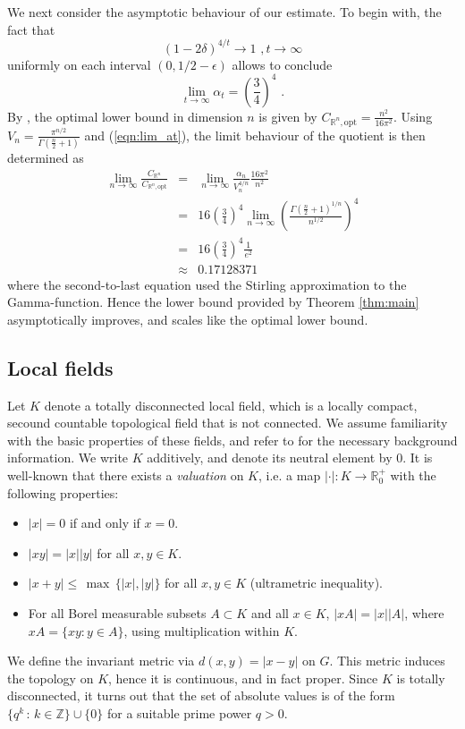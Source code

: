 \documentclass[12pt, reqno]{amsart}
\begin{document}
We next consider the asymptotic behaviour of our estimate. To begin with, the fact that 
\[ (1-2 \delta)^{4/t} \to 1\,\,, t \to \infty \]
uniformly on each interval $(0,1/2-\epsilon)$ allows to conclude
\begin{equation} \label{eqn:lim_at}
\lim_{t \to \infty} \alpha_t = \left( \frac{3}{4} \right)^4 \,\,.
\end{equation}
By \cite[Corollary 2.8]{MR1448337}, the optimal lower bound in dimension $n$ is given by $C_{\mathbb{R}^n,\mathrm{opt}} = \frac{n^2}{16 \pi^2}$. Using $V_n = \frac{\pi^{n/2}}{\Gamma(\frac{n}{2}+1)}$ and (\ref{eqn:lim_at}), the limit behaviour of the quotient is then determined as 
\begin{eqnarray*}
\lim_{n \to \infty} \frac{C_{\mathbb{R}^n}}{C_{\mathbb{R}^n,\mathrm{opt}}} & = & \lim_{n \to \infty}
\frac{\alpha_n}{V_n^{4/n}} \frac{16 \pi^2}{n^2} \\
& = & 16 \left( \frac{3}{4} \right)^4 \lim_{n \to \infty} \left( \frac{\Gamma(\frac{n}{2}+1)^{1/n}}{n^{1/2}} \right)^4 \\ & = & 16 \left( \frac{3}{4} \right)^4 \frac{1}{e^2} \\ & \approx & 0.17128371
\end{eqnarray*}
where the second-to-last equation used the Stirling approximation to the Gamma-function. Hence the lower bound provided by Theorem \ref{thm:main} asymptotically improves, and scales like the optimal lower bound. 

\subsection{Local fields}
\label{subsect:loc_field}

Let $K$ denote a totally disconnected local field, which is a locally compact, secound countable topological field that is not connected. 
We assume familiarity with the basic properties of these fields, and refer to \cite[Chapters I,II]{taible} for the necessary background information. We write $K$ additively, and denote its neutral element by $0$. 
It is well-known that there exists a \textit{valuation} on $K$, i.e. a map $|\cdot|: K \to \mathbb{R}_0^+$ with the following properties: 
\begin{itemize}
    \item $|x|=0$ if and only if $x=0$.
    \item $|xy|=|x||y|$ for all $x,y \in \mathit{K}$.
    \item $|x+y| \leq \,\max\,\{|x|,|y|\}$ for all $x,y \in \mathit{K}$ (ultrametric inequality). 
    \item For all Borel measurable subsets $A \subset K$ and all $x \in K$, $|xA| = |x| |A|$, where $xA = \{ x y: y \in A \}$, using multiplication within $K$.
\end{itemize}
We define the invariant metric via $d(x,y) = |x-y|$ on $G$. This metric induces the topology on $K$, hence it is continuous, and in fact proper. 
Since $\mathit{K}$ is totally disconnected, it turns out that the set of absolute values is of the form $\{q^k \,:\,k \in \mathbb{Z}\} \cup \{0\}$ for a suitable prime power $q > 0$. 
\end{document}
